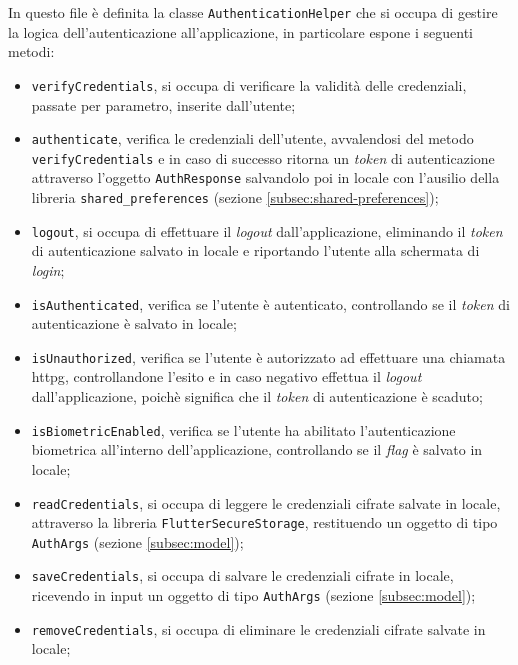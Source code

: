 In questo file è definita la classe \lstinline{AuthenticationHelper} che si occupa di gestire la logica dell'autenticazione all'applicazione, in particolare espone i seguenti metodi:
\begin{itemize}
    \item \lstinline{verifyCredentials}, si occupa di verificare la validità delle credenziali, passate per parametro, inserite dall'utente;
    \item \lstinline{authenticate}, verifica le credenziali dell'utente, avvalendosi del metodo \lstinline{verifyCredentials} e in caso di successo ritorna un \emph{token} di autenticazione attraverso l'oggetto \lstinline{AuthResponse} salvandolo poi in locale con l'ausilio della libreria \lstinline{shared_preferences}\cite{site:shared-preferences} (sezione \ref{subsec:shared-preferences});
    \item \lstinline{logout}, si occupa di effettuare il \emph{logout} dall'applicazione, eliminando il \emph{token} di autenticazione salvato in locale e riportando l'utente alla schermata di \emph{login};
    \item \lstinline{isAuthenticated}, verifica se l'utente è autenticato, controllando se il \emph{token} di autenticazione è salvato in locale;
    \item \lstinline{isUnauthorized}, verifica se l'utente è autorizzato ad effettuare una chiamata \gls{httpg}\glsoccur, controllandone l'esito e in caso negativo effettua il \emph{logout} dall'applicazione, poichè significa che il \emph{token} di autenticazione è scaduto;
    \item \lstinline{isBiometricEnabled}, verifica se l'utente ha abilitato l'autenticazione biometrica all'interno dell'applicazione, controllando se il \emph{flag} è salvato in locale;
    \item \lstinline{readCredentials}, si occupa di leggere le credenziali cifrate salvate in locale, attraverso la libreria \lstinline{FlutterSecureStorage}\cite{site:flutter-secure-storage}, restituendo un oggetto di tipo \lstinline{AuthArgs} (sezione \ref{subsec:model});
    \item \lstinline{saveCredentials}, si occupa di salvare le credenziali cifrate in locale, ricevendo in input un oggetto di tipo \lstinline{AuthArgs} (sezione \ref{subsec:model});
    \item \lstinline{removeCredentials}, si occupa di eliminare le credenziali cifrate salvate in locale;
\end{itemize}

